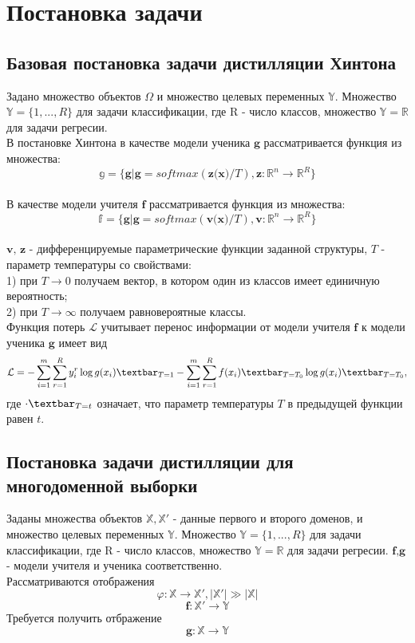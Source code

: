 \newpage

\section{Постановка задачи}

\subsection{Базовая постановка задачи дистилляции Хинтона}

Задано множество объектов $\Omega$ и множество целевых переменных $\mathbb{Y}$. Множество $\mathbb{Y}=\{1,...,R\}$ для задачи классификации, где R - число классов, множество $\mathbb{Y}=\mathbb{R}$ для задачи регресии.\\
В постановке Хинтона в качестве модели ученика $\textbf{g}$ рассматривается функция из множества: $$\mathbb{g}=\{\textbf{g}|\textbf{g}=softmax(\textbf{z(x)}/T), \textbf{z}:\mathbb{R}^{n}\rightarrow \mathbb{R}^{R}\}$$\\
В качестве модели учителя $\textbf{f}$ рассматривается функция из множества: $$\mathbb{f}=\{\textbf{g}|\textbf{g}=softmax(\textbf{v(x)}/T), \textbf{v}:\mathbb{R}^{n}\rightarrow \mathbb{R}^{R}\}$$\\
$\textbf{v, z}$ - дифференцируемые параметрические функции заданной структуры, $T$ - параметр температуры со свойствами:\\
1) при $T \rightarrow 0$ получаем вектор, в котором один из классов имеет единичную вероятность;\\ 
2) при $T \rightarrow \infty$ получаем равновероятные классы.\\
Функция потерь $\mathcal{L}$ учитывает перенос информации от модели учителя $\textbf{f}$ к модели ученика $\textbf{g}$ имеет вид $$\mathcal{L}=-\sum\limits_{i=1}^{m}\sum\limits_{r=1}^{R}y_{i}^{r}\log{g(x_{i})}\textbar_{T=1}-\sum\limits_{i=1}^{m}\sum\limits_{r=1}^{R}f(x_{i})\textbar_{T=T_{0}}\log{g(x_{i})}\textbar_{T=T_{0}},$$
где $\cdot\textbar_{T=t}$ означает, что параметр температуры $T$ в предыдущей функции равен $t$.

\subsection{Постановка задачи дистилляции для многодоменной выборки}

Заданы множества объектов $\mathbb{X}, \mathbb{X'}$ - данные первого и второго доменов, и множество целевых переменных $\mathbb{Y}$. Множество $\mathbb{Y}=\{1,...,R\}$ для задачи классификации, где R - число классов, множество $\mathbb{Y}=\mathbb{R}$ для задачи регресии. $\textbf{f,g}$ - модели учителя и ученика соответственно.\\
Рассматриваются отображения $$\varphi: \mathbb{X} \rightarrow \mathbb{X'}, |\mathbb{X'}| \gg |\mathbb{X}|$$ 
$$\textbf{f}: \mathbb{X'} \rightarrow \mathbb{Y}$$
Требуется получить отбражение $$\textbf{g}: \mathbb{X} \rightarrow \mathbb{Y}$$
